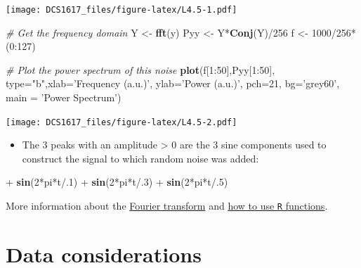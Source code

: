 \documentclass[]{book}
\newenvironment{Shaded}{\begin{snugshade}}{\end{snugshade}}
\newcommand{\KeywordTok}[1]{\textcolor[rgb]{0.13,0.29,0.53}{\textbf{{#1}}}}
\newcommand{\DataTypeTok}[1]{\textcolor[rgb]{0.13,0.29,0.53}{{#1}}}
\newcommand{\DecValTok}[1]{\textcolor[rgb]{0.00,0.00,0.81}{{#1}}}
\newcommand{\StringTok}[1]{\textcolor[rgb]{0.31,0.60,0.02}{{#1}}}
\newcommand{\CommentTok}[1]{\textcolor[rgb]{0.56,0.35,0.01}{\textit{{#1}}}}
\newcommand{\NormalTok}[1]{{#1}}
\providecommand{\tightlist}{%
  \setlength{\itemsep}{0pt}\setlength{\parskip}{0pt}}
\let\stdsection\section
\renewcommand\section{\newpage\stdsection}
\begin{document}
\texttt{[image: DCS1617\_files/figure-latex/L4.5-1.pdf]}

\begin{Shaded}
\begin{Highlighting}[]
\CommentTok{# Get the frequency domain}
\NormalTok{Y <-}\StringTok{ }\KeywordTok{fft}\NormalTok{(y)}
\NormalTok{Pyy <-}\StringTok{ }\NormalTok{Y*}\KeywordTok{Conj}\NormalTok{(Y)/}\DecValTok{256}
\NormalTok{f <-}\StringTok{ }\DecValTok{1000}\NormalTok{/}\DecValTok{256}\NormalTok{*(}\DecValTok{0}\NormalTok{:}\DecValTok{127}\NormalTok{)}

\CommentTok{# Plot the power spectrum of this noise}
\KeywordTok{plot}\NormalTok{(f[}\DecValTok{1}\NormalTok{:}\DecValTok{50}\NormalTok{],Pyy[}\DecValTok{1}\NormalTok{:}\DecValTok{50}\NormalTok{], }\DataTypeTok{type=}\StringTok{"b"}\NormalTok{,}\DataTypeTok{xlab=}\StringTok{'Frequency (a.u.)'}\NormalTok{, }\DataTypeTok{ylab=}\StringTok{'Power (a.u.)'}\NormalTok{, }\DataTypeTok{pch=}\DecValTok{21}\NormalTok{, }\DataTypeTok{bg=}\StringTok{'grey60'}\NormalTok{, }\DataTypeTok{main =} \StringTok{'Power Spectrum'}\NormalTok{)}
\end{Highlighting}
\end{Shaded}

\texttt{[image: DCS1617\_files/figure-latex/L4.5-2.pdf]}

\begin{itemize}
\tightlist
\item
  The \(3\) peaks with an amplitude \textgreater{} \(0\) are the \(3\)
  sine components used to construct the signal to which random noise was
  added:
\end{itemize}

\begin{Shaded}
\begin{Highlighting}[]
\NormalTok{+}\StringTok{ }\KeywordTok{sin}\NormalTok{(}\DecValTok{2}\NormalTok{*pi*t/.}\DecValTok{1}\NormalTok{) }
\NormalTok{+}\StringTok{ }\KeywordTok{sin}\NormalTok{(}\DecValTok{2}\NormalTok{*pi*t/.}\DecValTok{3}\NormalTok{) }
\NormalTok{+}\StringTok{ }\KeywordTok{sin}\NormalTok{(}\DecValTok{2}\NormalTok{*pi*t/.}\DecValTok{5}\NormalTok{)}
\end{Highlighting}
\end{Shaded}

More information about the
\href{https://en.wikipedia.org/wiki/Fourier_transform}{Fourier
transform} and
\href{http://www.di.fc.ul.pt/~jpn/r/fourier/fourier.html}{how to use
\texttt{R} functions}.

\hypertarget{data-considerations}{\section*{Data
considerations}\label{data-considerations}}
\end{document}
